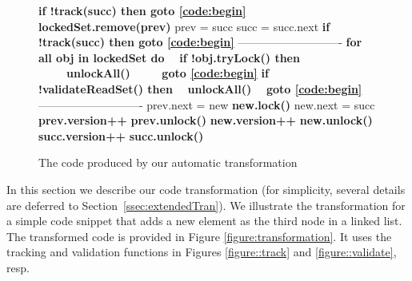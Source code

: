 \begin{figure*}
\begin{center}
\begin{subfigure}[t]{.45\textwidth}
\begin{algorithmic}[1]{}
{			\State{\spOne}\textbf{if !track(succ) then {goto} \ref{code:begin}}  \label{code:readGhaseGoto2}
			\State{\spOne}\textbf{lockedSet.remove(prev)} \label{code:lockedSet:remove2}
			\State{\spOne}prev = succ
			\State{\spOne}succ = succ.next
			\State{\spZero}\textbf{if !track(succ) then {goto} \ref{code:begin}} \label{code:readGhaseGoto3}
			\Statex ----------------------------
			\State{\spZero}\textbf{for all obj in lockedSet do} \label{code:validateLockedSet}	
            \State{\spZero}\ \ \textbf{if !obj.tryLock() then}
            \State{\spZero}\ \ \ \ \ \textbf{unlockAll()}
            \State{\spZero}\ \ \ \ \ \textbf{{goto} \ref{code:begin}} \label{code:validateGoto1}
			\State{\spZero}\textbf{if !validateReadSet() then} 		\label{code:validateReadSet}
				\State{\spZero}\ \ \textbf{unlockAll()}
				\State{\spZero}\ \ \textbf{{goto} \ref{code:begin}} \label{code:validateGoto2}
			\Statex ----------------------------
			\State{\spZero}prev.next = new
			\State{\spZero}\textbf{new.lock()}
			\State{\spZero}new.next = succ			
			\State{\spZero}\textbf{prev.version++}
			\State{\spZero}\textbf{prev.unlock()}
			\State{\spZero}\textbf{new.version++}
			\State{\spZero}\textbf{new.unlock()}
			\State{\spZero}\textbf{succ.version++}
			\State{\spZero}\textbf{succ.unlock()}

			\EndFunction
			}
		\end{algorithmic}
		\caption{The code produced by our automatic transformation}\label{figure:transformation:after}
	\end{subfigure}
	\end{center}
\vspace{-4mm}
	\caption{Code example.
	The synchronization code is in bold.
			\label{figure:transformation}}
\end{figure*}

In this section we describe our code transformation (for simplicity, several details are deferred to Section~\ref{ssec:extendedTran}).
We illustrate the transformation for a simple code snippet that adds a new element as the third node in a linked list.
The transformed code is provided in Figure \ref{figure:transformation}. It uses
the tracking and validation functions in Figures \ref{figure::track} and
\ref{figure::validate}, resp.

